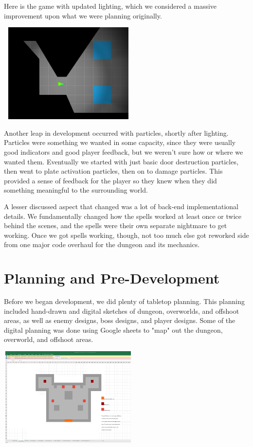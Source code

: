 \documentclass{sigchi}
\begin{document}
Here is the game with updated lighting, which we considered a massive improvement upon what we were planning originally.

\includegraphics*[width=7cm, height=5cm]{./figures/ourgame.png}

Another leap in development occurred with particles, shortly after lighting.  Particles were something we wanted in some capacity, since they were usually good indicators and good player feedback, but 
we weren't sure how or where we wanted them.  Eventually we started with just basic door destruction particles, then went to plate activation particles, then on to damage particles.  This provided a 
sense of feedback for the player so they knew when they did something meaningful to the surrounding world.

A lesser discussed aspect that changed was a lot of back-end implementational details.  We fundamentally changed how the spells worked at least once or twice behind the scenes, and the 
spells were their own separate nightmare to get working.  Once we got spells working, though, not too much else got reworked side from one major code overhaul for the dungeon and its mechanics.

\section{Planning and Pre-Development}
Before we began development, we did plenty of tabletop planning.  This planning included hand-drawn and digital sketches of dungeon, overworlds, 
and offshoot areas, as well as enemy designs, boss designs, and player designs.  Some of the digital planning was done using Google sheets\cite{googlesheets} to "map" out the dungeon, overworld, and offshoot areas.

\includegraphics*[width=7cm, height=5cm]{./figures/designexample.png}
\end{document}
